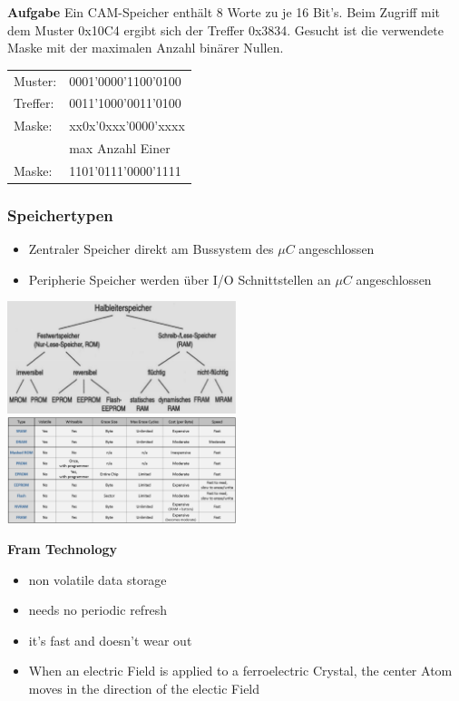 \textbf{Aufgabe}\newline
Ein CAM-Speicher enthält 8 Worte zu je 16 Bit's. Beim Zugriff mit dem Muster 0x10C4 ergibt sich der Treffer 0x3834.\newline
Gesucht ist die verwendete Maske mit der maximalen Anzahl binärer Nullen.\newline
\begin{tabular}{ll}
    Muster: & 0001'0000'1100'0100\\
    Treffer:& 0011'1000'0011'0100\\
    \hline
    Maske:  & xx0x'0xxx'0000'xxxx\\
    &max Anzahl Einer\\
    Maske:  & 1101'0111'0000'1111\\  
\end{tabular}

\subsubsection{Speichertypen}
\begin{itemize}
    \item Zentraler Speicher
    \subitem direkt am Bussystem des $ \mu C $ angeschlossen
    \item Peripherie Speicher
    \subitem werden über I/O Schnittstellen an $ \mu C $ angeschlossen
\end{itemize}
\begin{minipage}{0.5\linewidth}
    \includegraphics[width=0.5\textwidth]{images/SystembusSpeicherSpeichersystem/SpeicherSysHalbLeit}
    \includegraphics[width=0.5\textwidth]{images/SystembusSpeicherSpeichersystem/SpeicherSysHalbLeit1}
\end{minipage}\newline

\textbf{Fram Technology}
\begin{itemize}
    \item non volatile data storage
    \item needs no periodic refresh
    \item it's fast and doesn't wear out
    \item When an electric Field is applied to a ferroelectric Crystal, the center Atom moves in the direction of the electic Field
\end{itemize}

